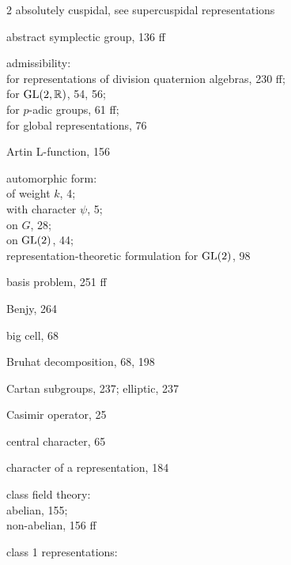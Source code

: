 ﻿\begin{multicols}{2}
\small
\noindent absolutely cuspidal, see supercuspidal representations\par
\noindent abstract symplectic group, 136 ff\par
\noindent admissibility:\\
\hspace*{1em}for representations of division quaternion algebras, 230 ff;\\
\hspace*{1em}for $\operatorname{GL}(2,\mathbb{R})$, 54, 56;\\
\hspace*{1em}for $p$-adic groups, 61 ff;\\
\hspace*{1em}for global representations, 76\par
\noindent Artin L-function, 156\par
\noindent automorphic form:\\
\hspace*{1em}of weight $k$, 4;\\
\hspace*{1em}with character $\psi$, 5;\\
\hspace*{1em}on $G$, 28;\\
\hspace*{1em}on $\operatorname{GL}(2)$, 44;\\
\hspace*{1em}representation-theoretic formulation for $\operatorname{GL}(2)$, 98\par
\noindent basis problem, 251 ff\par
\noindent Benjy, 264\par
\noindent big cell, 68\par
\noindent Bruhat decomposition, 68, 198\par
\noindent Cartan subgroups, 237; elliptic, 237\par
\noindent Casimir operator, 25\par
\noindent central character, 65\par
\noindent character of a representation, 184\par
\noindent class field theory:\\
\hspace*{1em}abelian, 155;\\
\hspace*{1em}non-abelian, 156 ff\par
\noindent class 1 representations:\\

\end{multicols}
